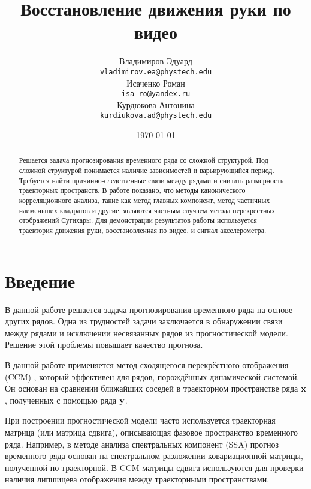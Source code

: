 \documentclass[a4paper]{article}
\title{Восстановление движения руки по видео}
\author{Владимиров Эдуард \\
	\texttt{vladimirov.ea@phystech.edu} \\

	\And
	Исаченко Роман \\
	\texttt{isa-ro@yandex.ru} \\
	
	\And
	Курдюкова Антонина \\
	\texttt{kurdiukova.ad@phystech.edu} \\
}
\date{\today}
\begin{document}
\maketitle

\begin{abstract}
	Решается задача прогнозирования временного ряда со сложной структурой. Под сложной структурой понимается наличие зависимостей и варьирующийся период. Требуется найти причинно-следственные связи между рядами и снизить размерность траекторных пространств. В работе показано, что методы канонического корреляционного анализа, такие как метод главных компонент, метод частичных наименьших квадратов и другие, являются частным случаем метода перекрестных отображений Сугихары. Для демонстрации результатов работы используется траектория движения руки, восстановленная по видео, и сигнал акселерометра.
\end{abstract}



\section{Введение}
В данной работе решается задача прогнозирования временного ряда на основе других рядов. 
Одна из трудностей задачи заключается в обнаружении связи между рядами и исключении несвязанных рядов из прогностической модели. 
Решение этой проблемы повышает качество прогноза.

В данной работе применяется метод сходящегося перекрёстного отображения (CCM) \citep{Sugihara90, sugihara1990nonlinear}, который эффективен для рядов, порождённых динамической системой. 
Он основан на сравнении ближайших соседей в траекторном пространстве ряда $\mathbf{x}$, полученных с помощью ряда $\mathbf{y}$.

При построении прогностической модели часто используется траекторная матрица (или матрица сдвига), описывающая фазовое пространство временного ряда. 
Например, в методе анализа спектральных компонент (SSA) \citep{golyandina2005ssa, golyandina2001analysis, zhigljavsky2010singular} прогноз временного ряда основан на спектральном разложении ковариационной матрицы, полученной по траекторной. 
В CCM матрицы сдвига используются для проверки наличия липшицева отображения между траекторными пространствами.
\end{document}
